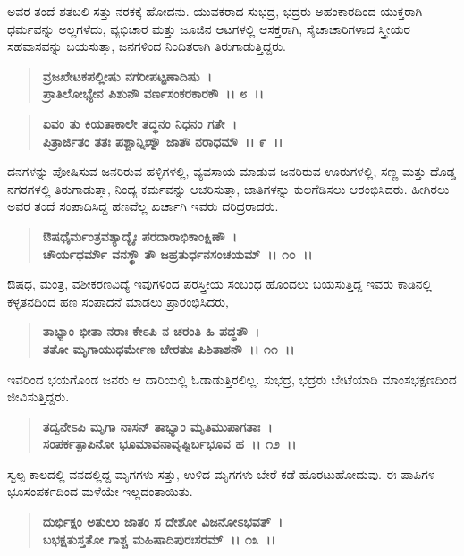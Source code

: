 ಅವರ ತಂದೆ ಶತಬಲಿ ಸತ್ತು ನರಕಕ್ಕೆ ಹೋದನು. ಯುವಕರಾದ ಸುಭದ್ರ, ಭದ್ರರು ಅಹಂಕಾರದಿಂದ ಯುಕ್ತರಾಗಿ ಧರ್ಮವನ್ನು ಅಲ್ಲಗಳೆದು, ವ್ಯಭಿಚಾರ ಮತ್ತು ಜೂಜಿನ ಆಟಗಳಲ್ಲಿ ಆಸಕ್ತರಾಗಿ, ಸೈಚಾಚಾರಿಗಳಾದ ಸ್ತ್ರೀಯರ ಸಹವಾಸವನ್ನು ಬಯಸುತ್ತಾ, ಜನಗಳಿಂದ ನಿಂದಿತರಾಗಿ ತಿರುಗಾಡುತ್ತಿದ್ದರು.

\begin{verse}
\textbf{ವ್ರಜಖೇಟಕಪಲ್ಲೀಷು ನಗರೀಪಟ್ಟಣಾದಿಷು~।}\\\textbf{ಪ್ರಾತಿಲೋಭ್ಯೇನ ಪಿಶುನೌ ವರ್ಣಸಂಕರಕಾರಕೌ~।। ೮~।। }
\end{verse}

\begin{verse}
\textbf{ಏವಂ ತು ಕಿಯತಾಕಾಲೇ ತದ್ಧನಂ ನಿಧನಂ ಗತೇ~।}\\\textbf{ಪಿತ್ರಾರ್ಜಿತಂ ತತಃ ಪಶ್ಚಾನ್ನಿಃಸ್ವೌ ಜಾತೌ ನರಾಧಮೌ~।। ೯~।।}
\end{verse}

ದನಗಳನ್ನು ಪೋಷಿಸುವ ಜನರಿರುವ ಹಳ್ಳಿಗಳಲ್ಲಿ, ವ್ಯವಸಾಯ ಮಾಡುವ ಜನರಿರುವ ಊರುಗಳಲ್ಲಿ, ಸಣ್ಣ ಮತ್ತು ದೊಡ್ಡ ನಗರಗಳಲ್ಲಿ ತಿರುಗಾಡುತ್ತಾ, ನಿಂದ್ಯ ಕರ್ಮವನ್ನು ಆಚರಿಸುತ್ತಾ, ಜಾತಿಗಳನ್ನು ಕುಲಗೆಡಿಸಲು ಆರಂಭಿಸಿದರು. ಹೀಗಿರಲು ಅವರ ತಂದೆ ಸಂಪಾದಿಸಿದ್ದ ಹಣವೆಲ್ಲ ಖರ್ಚಾಗಿ ಇವರು ದರಿದ್ರರಾದರು.

\begin{verse}
\textbf{ಔಷಧೈರ್ಮಂತ್ರವಶ್ಯಾದ್ಯೈಃ ಪರದಾರಾಭಿಕಾಂಕ್ಷಿಣೌ~।}\\\textbf{ಚೌರ್ಯಧರ್ಮೌ ವನಸ್ಥೌ ತೌ ಜಹ್ರತುರ್ಧನಸಂಚಯಮ್~।। ೧೦~।।}
\end{verse}

ಔಷಧ, ಮಂತ್ರ, ವಶೀಕರಣವಿದ್ಯೆ ಇವುಗಳಿಂದ ಪರಸ್ತ್ರೀಯ ಸಂಬಂಧ ಹೊಂದಲು ಬಯಸುತ್ತಿದ್ದ ಇವರು ಕಾಡಿನಲ್ಲಿ ಕಳ್ಳತನದಿಂದ ಹಣ ಸಂಪಾದನೆ ಮಾಡಲು ಪ್ರಾರಂಭಿಸಿದರು,

\begin{verse}
\textbf{ತಾಭ್ಯಾಂ ಭೀತಾ ನರಾಃ ಕೇಽಪಿ ನ ಚರಂತಿ ಹಿ ಪದ್ಧತೌ~।}\\\textbf{ತತೋ ಮೃಗಾಯುಧರ್ಮೇಣ ಚೇರತುಃ ಪಿಶಿತಾಶನೌ~।। ೧೧~।।}
\end{verse}

ಇವರಿಂದ ಭಯಗೊಂಡ ಜನರು ಆ ದಾರಿಯಲ್ಲಿ ಓಡಾಡುತ್ತಿರಲಿಲ್ಲ. ಸುಭದ್ರ, ಭದ್ರರು ಬೇಟೆಯಾಡಿ ಮಾಂಸಭಕ್ಷಣದಿಂದ ಜೀವಿಸುತ್ತಿದ್ದರು.

\begin{verse}
\textbf{ತದ್ವನೇಽಪಿ ಮೃಗಾ ನಾಸನ್ ತಾಭ್ಯಾಂ ಮೃತಿಮುಪಾಗತಾಃ~।}\\\textbf{ಸಂಪರ್ಕತ್ಪಾಪಿನೋ ಭೂಮಾವನಾವೃಷ್ಟಿರ್ಬಭೂವ ಹ~।। ೧೨~।।}
\end{verse}

ಸ್ವಲ್ಪ ಕಾಲದಲ್ಲಿ ವನದಲ್ಲಿದ್ದ ಮೃಗಗಳು ಸತ್ತು, ಉಳಿದ ಮೃಗಗಳು ಬೇರೆ ಕಡೆ ಹೊರಟುಹೋದುವು. ಈ ಪಾಪಿಗಳ ಭೂಸಂಪರ್ಕದಿಂದ ಮಳೆಯೇ ಇಲ್ಲದಂತಾಯಿತು.

\begin{verse}
\textbf{ದುರ್ಭಿಕ್ಷಂ ಅತುಲಂ ಜಾತಂ ಸ ದೇಶೋ ವಿಜನೋಽಭವತ್~।}\\\textbf{ಬಭಕ್ಷತುಸ್ತತೋ ಗಾಶ್ಚ ಮಹಿಷಾದಿಪುರಃಸರಮ್~।। ೧೩~।।}
\end{verse}


